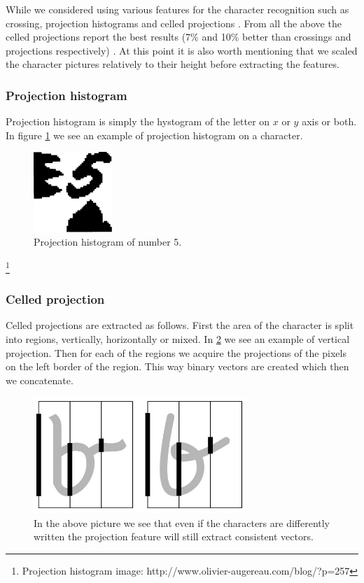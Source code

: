 While we considered using various features for the character recognition such as crossing, projection histograms and celled projections \cite{HWR:features1}\cite{HWR:features2}. From all the above the celled projections report the best results (7\% and 10\% better than crossings and projections respectively) \cite{HWR:features1}. At this point it is also worth mentioning that we scaled the character pictures relatively to their height before extracting the features.

\subsubsection{Projection histogram}
Projection histogram \cite{Chacko2015} is simply the hystogram of the letter on $x$ or $y$ axis or both. In figure \ref{fig:method:features:hist_proj} we see an example of projection histogram on a character.

\begin{figure}[ht]
	\centering
	\includegraphics[width=8em]{shared/img/hist_project.png}
	\caption{Projection histogram of number 5.}
	\label{fig:method:features:hist_proj}
\end{figure}


\footnote{Projection histogram image: http://www.olivier-augereau.com/blog/?p=257}

\subsubsection{Celled projection}
Celled projections are extracted as follows. First the area of the character is split into regions, vertically, horizontally or mixed. In \ref{fig:method:features:feature} we see an example of vertical projection. Then for each of the regions we acquire the projections of the pixels on the left border of the region. This way binary vectors are created which then we concatenate.

\begin{figure}[ht]
	\includegraphics[width=8cm]{shared/img/projection_letter.jpg}
	\caption{In the above picture we see that even if the characters are differently written the projection feature will still extract consistent vectors.}
	\label{fig:method:features:feature}
\end{figure}

